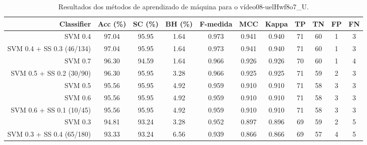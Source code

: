 \begin{table}[!htb]
\centering
\caption{Resultados dos métodos de aprendizado de máquina para o vídeo08-uelHwf8o7_U.}
\label{tab:08-uelHwf8o7_U}
\begin{tabular}{r|c|c|c|c|c|c|c|c|c|c}
\hline\hline
Classifier & Acc (\%) & SC (\%) & BH (\%) & F-medida & MCC & Kappa & TP & TN & FP & FN \\ \hline
SVM 0.4 & 97.04 & 95.95 & 1.64 & 0.973 & 0.941 & 0.940 & 71 & 60 & 1 & 3 \\ 
SVM 0.4 + SS 0.3 (46/134) & 97.04 & 95.95 & 1.64 & 0.973 & 0.941 & 0.940 & 71 & 60 & 1 & 3 \\ 
SVM 0.7 & 96.30 & 94.59 & 1.64 & 0.966 & 0.926 & 0.926 & 70 & 60 & 1 & 4 \\ 
SVM 0.5 + SS 0.2 (30/90) & 96.30 & 95.95 & 3.28 & 0.966 & 0.925 & 0.925 & 71 & 59 & 2 & 3 \\ 
SVM 0.5 & 95.56 & 95.95 & 4.92 & 0.959 & 0.910 & 0.910 & 71 & 58 & 3 & 3 \\ 
SVM 0.6 & 95.56 & 95.95 & 4.92 & 0.959 & 0.910 & 0.910 & 71 & 58 & 3 & 3 \\ 
SVM 0.6 + SS 0.1 (10/45) & 95.56 & 95.95 & 4.92 & 0.959 & 0.910 & 0.910 & 71 & 58 & 3 & 3 \\ 
SVM 0.3 & 94.81 & 93.24 & 3.28 & 0.952 & 0.897 & 0.896 & 69 & 59 & 2 & 5 \\ 
SVM 0.3 + SS 0.4 (65/180) & 93.33 & 93.24 & 6.56 & 0.939 & 0.866 & 0.866 & 69 & 57 & 4 & 5 \\ 
\hline\hline
\end{tabular}
\end{table}
